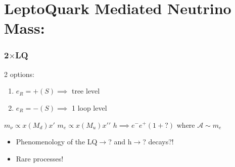 \documentclass[10pt,letterpaper,oneside]{article}
\begin{document}
\part{LeptoQuark Mediated Neutrino Mass:}
\section{2$\times$LQ}
2 options: \begin{enumerate}
\item $e_R = + (S) \implies$ tree level
\item $e_R = - (S) \implies$ 1 loop level
\end{enumerate}
\Large
\begin{center}
$m_{\nu}\propto x \left(M_d\right) x\prime$ \quad
$m_{e}\propto x \left(M_u\right) x\prime \prime$ \quad
$h \implies e^- e^+ \left(1+?\right)$ where $\mathcal{A}\sim m_e$ \\
\end{center}
\normalsize
\begin{itemize}
\item Phenomenology of the LQ$\rightarrow$? and h$\rightarrow$? decays?!
\item Rare processes!
\end{itemize} 
\end{document}
